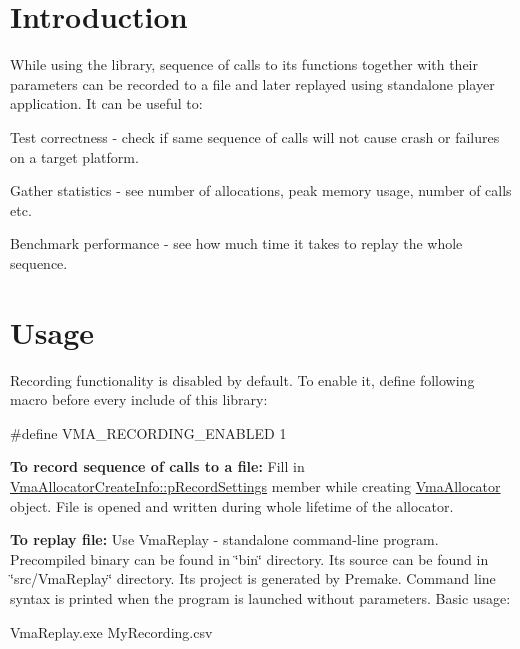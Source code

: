 \hypertarget{record_and_replay_record_and_replay_introduction}{}\section{Introduction}\label{record_and_replay_record_and_replay_introduction}
While using the library, sequence of calls to its functions together with their parameters can be recorded to a file and later replayed using standalone player application. It can be useful to\+:


\begin{DoxyItemize}
\item Test correctness -\/ check if same sequence of calls will not cause crash or failures on a target platform.
\item Gather statistics -\/ see number of allocations, peak memory usage, number of calls etc.
\item Benchmark performance -\/ see how much time it takes to replay the whole sequence.
\end{DoxyItemize}\hypertarget{record_and_replay_record_and_replay_usage}{}\section{Usage}\label{record_and_replay_record_and_replay_usage}
Recording functionality is disabled by default. To enable it, define following macro before every include of this library\+:


\begin{DoxyCode}
\textcolor{preprocessor}{#define VMA\_RECORDING\_ENABLED 1}
\end{DoxyCode}


{\bfseries To record sequence of calls to a file\+:} Fill in \hyperlink{structVmaAllocatorCreateInfo_ace2aa4877b16a42b0b7673d4e26000ee}{Vma\+Allocator\+Create\+Info\+::p\+Record\+Settings} member while creating \hyperlink{structVmaAllocator}{Vma\+Allocator} object. File is opened and written during whole lifetime of the allocator.

{\bfseries To replay file\+:} Use Vma\+Replay -\/ standalone command-\/line program. Precompiled binary can be found in \char`\"{}bin\char`\"{} directory. Its source can be found in \char`\"{}src/\+Vma\+Replay\char`\"{} directory. Its project is generated by Premake. Command line syntax is printed when the program is launched without parameters. Basic usage\+: \begin{DoxyVerb}VmaReplay.exe MyRecording.csv
\end{DoxyVerb}


